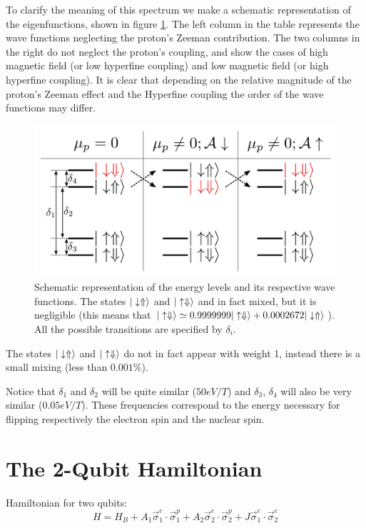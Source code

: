 To clarify the meaning of this spectrum we make a schematic representation of the eigenfunctions, shown in figure \ref{levels}. The left column in the table represents the wave functions neglecting the proton's Zeeman contribution. The two columns in the right do not neglect the proton's coupling, and show the cases of high magnetic field (or low hyperfine coupling) and low magnetic field (or high hyperfine coupling). It is clear that depending on the relative magnitude of the proton's Zeeman effect and the Hyperfine coupling the order of the wave functions may differ.
\begin{figure}[h!]
\centering
\includegraphics{chapter03/figures/levels.png}
\vspace{-5pt}
\caption{Schematic representation of the energy levels and its respective wave functions. The states $|\downarrow\Uparrow\rangle$ and $|\uparrow\Downarrow\rangle$ and in fact mixed, but it is negligible (this means that $|\uparrow\Downarrow\rangle\simeq0.9999999|\uparrow\Downarrow\rangle+0.0002672|\downarrow\Uparrow\rangle$). All the possible transitions are specified by $\delta_i$.}
\label{levels}
\end{figure}
\FloatBarrier
The states $|\downarrow\Uparrow\rangle$ and $|\uparrow\Downarrow\rangle$ do not in fact appear with weight 1, instead there is a small mixing (less than $0.001\%$).

Notice that $\delta_1$ and $\delta_2$ will be quite similar ($50eV/T$) and $\delta_3$, $\delta_4$ will also be very similar ($0.05eV/T$). These frequencies correspond to the energy necessary for flipping respectively the electron spin and the nuclear spin.



\section{The 2-Qubit Hamiltonian}
 Hamiltonian for two qubits:
\begin{equation}
  H = H_B +A_1\vec{\sigma}^e_1\cdot\vec{\sigma}^p_1
      +A_2\vec{\sigma}^e_2\cdot\vec{\sigma}^p_2
      +J\vec{\sigma}^e_1\cdot\vec{\sigma}^e_2
\end{equation}


